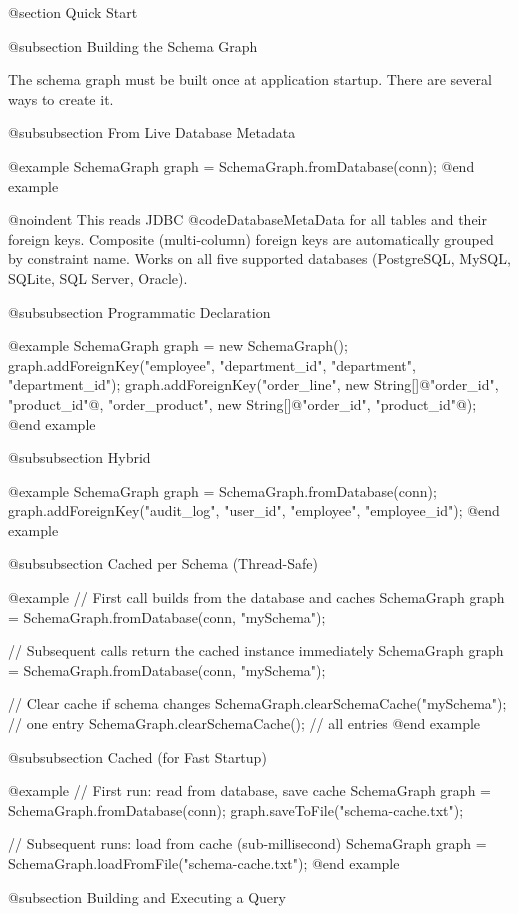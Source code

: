 @section Quick Start

@subsection Building the Schema Graph

The schema graph must be built once at application startup.  There
are several ways to create it.

@subsubsection From Live Database Metadata

@example
SchemaGraph graph = SchemaGraph.fromDatabase(conn);
@end example

@noindent
This reads JDBC @code{DatabaseMetaData} for all tables and their foreign
keys.  Composite (multi-column) foreign keys are automatically grouped
by constraint name.  Works on all five supported databases (PostgreSQL,
MySQL, SQLite, SQL Server, Oracle).

@subsubsection Programmatic Declaration

@example
SchemaGraph graph = new SchemaGraph();
graph.addForeignKey("employee", "department_id",
                    "department", "department_id");
graph.addForeignKey("order_line",
    new String[]@{"order_id", "product_id"@},
    "order_product",
    new String[]@{"order_id", "product_id"@});
@end example

@subsubsection Hybrid

@example
SchemaGraph graph = SchemaGraph.fromDatabase(conn);
graph.addForeignKey("audit_log", "user_id",
                    "employee", "employee_id");
@end example

@subsubsection Cached per Schema (Thread-Safe)

@example
// First call builds from the database and caches
SchemaGraph graph = SchemaGraph.fromDatabase(conn, "mySchema");

// Subsequent calls return the cached instance immediately
SchemaGraph graph = SchemaGraph.fromDatabase(conn, "mySchema");

// Clear cache if schema changes
SchemaGraph.clearSchemaCache("mySchema");  // one entry
SchemaGraph.clearSchemaCache();            // all entries
@end example

@subsubsection Cached (for Fast Startup)

@example
// First run: read from database, save cache
SchemaGraph graph = SchemaGraph.fromDatabase(conn);
graph.saveToFile("schema-cache.txt");

// Subsequent runs: load from cache (sub-millisecond)
SchemaGraph graph = SchemaGraph.loadFromFile("schema-cache.txt");
@end example

@subsection Building and Executing a Query

